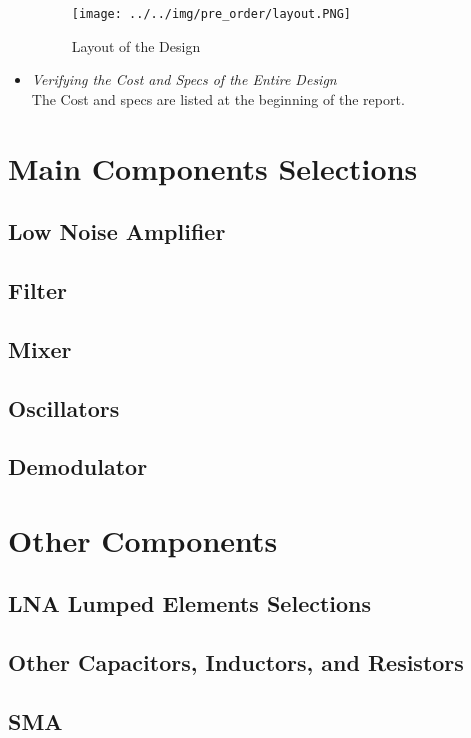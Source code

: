 \documentclass[]{article}
\begin{document}
\begin{itemize}
            \begin{figure}[p]
                \begin{center}
                    \texttt{[image: ../../img/pre\_order/layout.PNG]}~
                    \label{layout}
                    \caption{Layout of the Design}
                \end{center}
            \end{figure}
            
        \item \textit{Verifying the Cost and Specs of the Entire Design} \\
            The Cost and specs are listed at the beginning of the report.

    \end{itemize}

\section{Main Components Selections}
\subsection{Low Noise Amplifier}
\subsection{Filter}
\subsection{Mixer}
\subsection{Oscillators}
\subsection{Demodulator}
\section{Other Components}
\subsection{LNA Lumped Elements Selections}
\subsection{Other Capacitors, Inductors, and Resistors}
\subsection{SMA}
\end{document}
